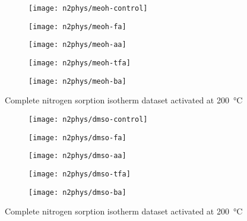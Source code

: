 \begin{figure}[htb]\ContinuedFloat{}
    \centering
    \begin{subfigure}{0.4\linewidth}
        \texttt{[image: n2phys/meoh-control]}%
        \label{appx:def:fgr:n2phys-meoh-cont}
    \end{subfigure}
    \begin{subfigure}{0.4\linewidth}
        \texttt{[image: n2phys/meoh-fa]}%
        \label{appx:def:fgr:n2phys-meoh-fa}
    \end{subfigure}

    
    \begin{subfigure}{0.4\linewidth}
        \texttt{[image: n2phys/meoh-aa]}%
        \label{appx:def:fgr:n2phys-meoh-aa}
    \end{subfigure}
    \begin{subfigure}{0.4\linewidth}
        \texttt{[image: n2phys/meoh-tfa]}%
        \label{appx:def:fgr:n2phys-meoh-tfa}
    \end{subfigure}

    \begin{subfigure}{0.4\linewidth}
        \texttt{[image: n2phys/meoh-ba]}%
        \label{appx:def:fgr:n2phys-meoh-ba}
    \end{subfigure}

    \caption{Complete nitrogen sorption isotherm dataset activated at \SI{200}{\degreeCelsius}}%
    
\end{figure}
\begin{figure}[htb]\ContinuedFloat{}
    \centering
    \begin{subfigure}{0.4\linewidth}
        \texttt{[image: n2phys/dmso-control]}%
        \label{appx:def:fgr:n2phys-dmso-cont}
    \end{subfigure}
    \begin{subfigure}{0.4\linewidth}
        \texttt{[image: n2phys/dmso-fa]}%
        \label{appx:def:fgr:n2phys-dmso-fa}
    \end{subfigure}

    
    \begin{subfigure}{0.4\linewidth}
        \texttt{[image: n2phys/dmso-aa]}%
        \label{appx:def:fgr:n2phys-dmso-aa}
    \end{subfigure}
    \begin{subfigure}{0.4\linewidth}
        \texttt{[image: n2phys/dmso-tfa]}%
        \label{appx:def:fgr:n2phys-dmso-tfa}
    \end{subfigure}

    \begin{subfigure}{0.4\linewidth}
        \texttt{[image: n2phys/dmso-ba]}%
        \label{appx:def:fgr:n2phys-dmso-ba}
    \end{subfigure}

    \caption{Complete nitrogen sorption isotherm dataset activated at \SI{200}{\degreeCelsius}}%
    
\end{figure}